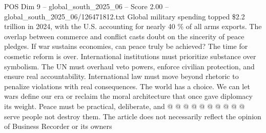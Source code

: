 \begin{textsample}{POS Dim 9 – global\_south\_2025\_06 – Score 2.00 – global\_south\_2025\_06/126471812.txt}
Global military spending topped \$2.2 trillion in 2024, with the U.S. accounting for nearly 40 \% of all arms exports.
The overlap between commerce and conflict casts doubt on the sincerity of peace pledges.
If war sustains economies, can peace truly be achieved?
The time for cosmetic reform is over.
International institutions must prioritize substance over symbolism.
The UN must overhaul veto powers, enforce civilian protection, and ensure real accountability.
International law must move beyond rhetoric to penalize violations with real consequences.
The world has a choice.
We can let wars define our era or reclaim the moral architecture that once gave diplomacy its weight.
Peace must be practical, deliberate, and @ @ @ @ @ @ @ @ @ @ serve people not destroy them.
The article does not necessarily reflect the opinion of Business Recorder or its owners

\end{textsample}
